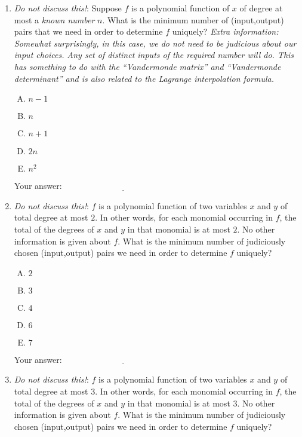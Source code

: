 \documentclass[10pt]{amsart}
\begin{document}
\begin{enumerate}
\item {\em Do not discuss this!}: Suppose $f$ is a polynomial function
  of $x$ of degree at most a {\em known number} $n$. What is the
  minimum number of (input,output) pairs that we need in order to
  determine $f$ uniquely? {\em Extra information: Somewhat
    surprisingly, in this case, we do not need to be judicious about
    our input choices. Any set of distinct inputs of the required
    number will do. This has something to do with the ``Vandermonde
    matrix'' and ``Vandermonde determinant'' and is also related to
    the Lagrange interpolation formula.}

  \begin{enumerate}[(A)]
  \item $n - 1$
  \item $n$
  \item $n + 1$
  \item $2n$
  \item $n^2$
  \end{enumerate}

  \vspace{0.1in}
  Your answer: $\underline{\qquad\qquad\qquad\qquad\qquad\qquad\qquad}$
  \vspace{0.6in}

\item {\em Do not discuss this!}: $f$ is a polynomial function of two
  variables $x$ and $y$ of total degree at most $2$. In other words,
  for each monomial occurring in $f$, the total of the degrees of $x$
  and $y$ in that monomial is at most $2$. No other information is
  given about $f$. What is the minimum number of judiciously chosen
  (input,output) pairs we need in order to determine $f$ uniquely?

  \begin{enumerate}[(A)]
  \item $2$
  \item $3$
  \item $4$
  \item $6$
  \item $7$
  \end{enumerate}

  \vspace{0.1in}
  Your answer: $\underline{\qquad\qquad\qquad\qquad\qquad\qquad\qquad}$
  \vspace{0.6in}

\item {\em Do not discuss this!}: $f$ is a polynomial function of two
  variables $x$ and $y$ of total degree at most $3$. In other words,
  for each monomial occurring in $f$, the total of the degrees of $x$
  and $y$ in that monomial is at most $3$. No other information is
  given about $f$. What is the minimum number of judiciously chosen
  (input,output) pairs we need in order to determine $f$ uniquely?


\end{enumerate}
\end{document}

